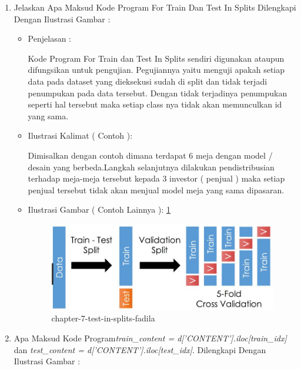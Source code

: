 \begin{enumerate}
\item Jelaskan Apa Maksud Kode Program For Train Dan Test In Splits Dilengkapi Dengan Ilustrasi Gambar :
\begin{itemize}
\item Penjelasan	:
\par Kode Program For Train dan Test In Splits sendiri digunakan ataupun difungsikan untuk pengujian. Pegujiannya yaitu menguji apakah setiap data pada dataset yang dieksekusi sudah di split dan tidak terjadi penumpukan pada data tersebut. Dengan tidak terjadinya penumpukan seperti hal tersebut maka setiap class nya tidak akan memunculkan id yang sama.
\par 
\par
\par
\item Ilustrasi Kalimat ( Contoh ):
\par Dimisalkan dengan contoh dimana terdapat 6 meja dengan model / desain yang berbeda.Langkah selanjutnya dilakukan pendistribusian terhadap meja-meja tersebut kepada 3 investor ( penjual ) maka setiap penjual tersebut tidak akan menjual model meja yang sama dipasaran.
\par
\item Ilustrasi Gambar ( Contoh Lainnya ): \ref{chapter-7-test-in-splits-fadila}
\par
\begin{figure}[!hbtp]
\centering
\includegraphics[scale=0.2]{figures/chapter-7-test-in-splits-fadila.jpg}
\caption{chapter-7-test-in-splits-fadila}
\label{chapter-7-test-in-splits-fadila}
\end{figure}
\par
\par
\end{itemize}
\par
\par
\par
\item Apa Maksud Kode Program\emph{train\_content = d['CONTENT'].iloc[train\_idx]} dan \emph{test\_content = d['CONTENT'].iloc[test\_idx]}. Dilengkapi Dengan Ilustrasi Gambar :

\end{enumerate}
